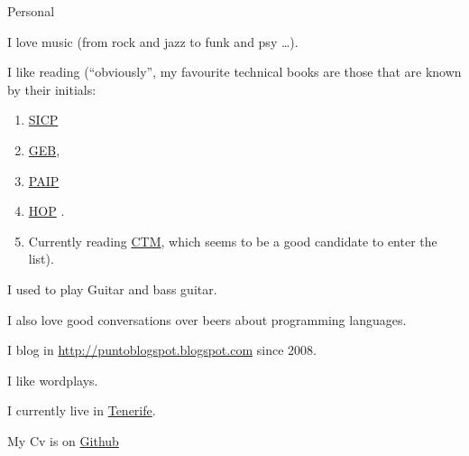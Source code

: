 \documentclass{resume} %
\begin{document}
\begin{rSection}{Personal}

\item I love music (from rock and jazz to funk and psy \ldots).
\item I like reading (``obviously'', my favourite technical books are
  those that are known by their initials:
  \begin{enumerate}
  \item \href{https://mitpress.mit.edu/sicp/}{SICP}
  \item \href{https://en.wikipedia.org/wiki/G%C3%B6del,_Escher,_Bach}{GEB},
  \item \href{http://norvig.com/paip.html}{PAIP}
  \item \href{http://hop.perl.plover.com/}{HOP} .
  \item Currently reading
    \href{https://www.info.ucl.ac.be/~pvr/book.html}{CTM}, which seems
    to be a good candidate to enter the list).
  \end{enumerate}
\item I used to play Guitar and bass guitar.
\item I also love good conversations over beers about programming
  languages.

\item I blog in \url{http://puntoblogspot.blogspot.com} since 2008.
\item I like wordplays.
\item I currently live in \href{https://www.google.es/maps/place/Tenerife/@28.2925426,-17.0803948,9z/data=!3m1!4b1!4m2!3m1!1s0xc4029effe8682ed:0xb01a4bf1c84baf3c}{Tenerife}.
\item My Cv is on \href{https://github.com/kidd/Me}{Github}
\end{rSection}





\end{document}
